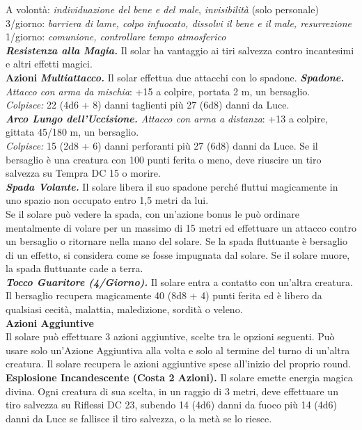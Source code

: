 \begin{multicols}{2}
A volontà: \emph{individuazione del bene e del male}, \emph{invisibilità} (solo personale)\\
3/giorno: \emph{barriera di lame, colpo infuocato, dissolvi il bene e il} \emph{male, resurrezione}\\
1/giorno: \emph{comunione, controllare tempo atmosferico}\\
\emph{\textbf{Resistenza alla Magia.}} Il solar ha vantaggio ai tiri salvezza contro incantesimi e altri effetti magici.\\
\smallskip\textbf{Azioni}
\emph{\textbf{Multiattacco.}} Il solar effettua due attacchi con lo spadone.
\emph{\textbf{Spadone.} Attacco con arma da mischia}: +15 a colpire, portata 2 m, un bersaglio.\\
\emph{Colpisce:} 22 (4d6 + 8) danni taglienti più 27 (6d8) danni da Luce.\\
\emph{\textbf{Arco Lungo dell'Uccisione.} Attacco con arma a distanza}: +13 a colpire, gittata 45/180 m, un bersaglio.\\
\emph{Colpisce:} 15 (2d8 + 6) danni perforanti più 27 (6d8) danni da Luce. Se il bersaglio è una creatura con 100 punti ferita o meno, deve riuscire un tiro salvezza su Tempra DC 15 o morire. \\
\emph{\textbf{Spada Volante.}} Il solare libera il suo spadone perché fluttui magicamente in uno spazio non occupato entro 1,5 metri da lui.\\
Se il solare può vedere la spada, con un'azione bonus le può ordinare mentalmente di volare per un massimo di 15 metri ed effettuare un attacco contro un bersaglio o ritornare nella mano del solare. Se la spada fluttuante è bersaglio di un effetto, si considera come se fosse impugnata dal solare. Se il solare muore, la spada fluttuante cade a terra.\\
\emph{\textbf{Tocco Guaritore (4/Giorno).}} Il solare entra a contatto con  un'altra creatura. Il bersaglio recupera magicamente 40 (8d8 + 4) punti ferita ed è libero da qualsiasi cecità, malattia, maledizione, sordità o veleno.\\
\textbf{Azioni Aggiuntive}\\
Il solare può effettuare 3 azioni aggiuntive, scelte tra le opzioni seguenti. Può usare solo un'Azione Aggiuntiva alla volta e solo al termine del turno di un'altra creatura. Il solare recupera le azioni aggiuntive spese all'inizio del proprio round. \\
\textbf{Esplosione Incandescente (Costa 2 Azioni).} Il solare emette energia magica divina. Ogni creatura di sua scelta, in un raggio di 3 metri, deve effettuare un tiro salvezza su Riflessi DC 23, subendo 14 (4d6) danni da fuoco più 14 (4d6) danni da Luce se fallisce il tiro salvezza, o la metà se lo riesce. \\ 

\end{multicols}
